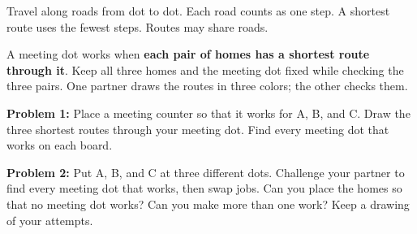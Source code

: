\documentclass[12pt,letterpaper]{article}
\newcommand{\problem}[2]{\par\textbf{Problem #1:} #2\par}
\newcommand{\grid}[1]{\draw[gray!65,line width=.6pt,step=1] (0,0) grid (#1,#1);\foreach \x in {0,...,#1}\foreach \y in {0,...,#1}\fill (\x,\y) circle (1.7pt);}
\newcommand{\home}[3]{\node[draw,circle,fill=white,inner sep=3pt,font=\bfseries] at (#1,#2){#3};}
\begin{document}
Travel along roads from dot to dot. Each road counts as one step. A shortest route uses the fewest steps. Routes may share roads.

A meeting dot works when \textbf{each pair of homes has a shortest route through it}. Keep all three homes and the meeting dot fixed while checking the three pairs. One partner draws the routes in three colors; the other checks them.

\begin{center}
\end{center}
\problem{1}{Place a meeting counter so that it works for A, B, and C. Draw the three shortest routes through your meeting dot. Find every meeting dot that works on each board.}
\vspace{.25in}
\begin{center}
\hfill
{}
\end{center}
\vfill
\newpage
\problem{2}{Put A, B, and C at three different dots. Challenge your partner to find every meeting dot that works, then swap jobs. Can you place the homes so that no meeting dot works? Can you make more than one work? Keep a drawing of your attempts.}
\vspace{.25in}
\begin{center}
\hfill
{}
\vspace{.6in}

\hfill
{}
\end{center}
\end{document}

